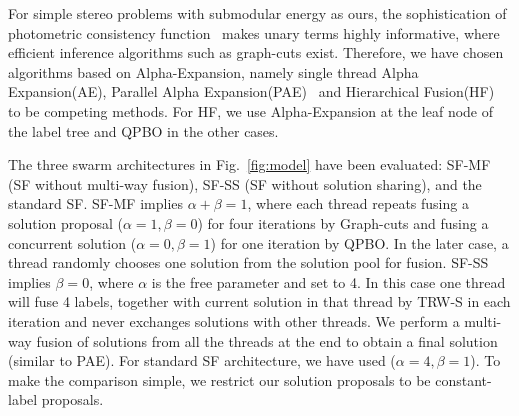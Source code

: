 %


\noindent For simple stereo problems with submodular energy as ours, the
sophistication of photometric consistency
function~\cite{mvs_furukawa_survey} makes unary terms highly
informative, where efficient inference algorithms such as graph-cuts
exist.
Therefore, we have chosen algorithms based on Alpha-Expansion, namely
single thread Alpha Expansion(AE), Parallel Alpha
Expansion(PAE)~\cite{fusion_moves_for_markov_random_field_optimization}
and Hierarchical Fusion(HF)~\cite{olga_hierarchical_alpha_expansion} to
be competing methods. For HF, we use Alpha-Expansion at the leaf node of
the label tree and QPBO in the other cases.


\noindent The three swarm architectures in Fig.~\ref{fig:model} have
been evaluated: SF-MF (SF without multi-way fusion), SF-SS (SF without
solution sharing), and the standard SF.
%
SF-MF implies $\alpha+\beta=1$, where each thread repeats
fusing a solution proposal ($\alpha=1, \beta=0$) for four iterations
by Graph-cuts and fusing a concurrent solution  ($\alpha=0, \beta=1$)
for one iteration by QPBO.
In the later case, a thread randomly chooses one solution from the
solution pool for fusion. SF-SS implies $\beta=0$, where $\alpha$ is
the free parameter and set to 4. In this case one thread will fuse 4
labels, together with current solution in that thread by TRW-S in each
iteration and never exchanges solutions with other threads. We perform
a multi-way fusion of solutions from all the threads at the end to
obtain a final solution
(similar to PAE). For standard SF architecture, we have used
($\alpha=4, \beta=1$).  To make the comparison simple, we restrict our
solution proposals to be constant-label proposals.
%
